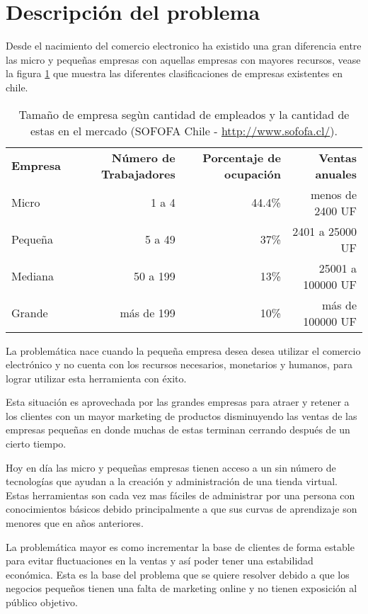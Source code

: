 \section{Descripción del problema}

Desde el nacimiento del comercio electronico ha existido una gran diferencia
entre las micro y pequeñas empresas con aquellas empresas con mayores recursos,
vease la figura \ref{tab:tam_empresa} que muestra las diferentes clasificaciones
de empresas existentes en chile.

\begin{table}[h]
\centering
\begin{tabular}{lrrr}
{\bf Empresa}  & {\bf Número de Trabajadores} & {\bf Porcentaje de ocupación} & {\bf Ventas anuales}\\
Micro    & 1 a 4                & 44.4\%  & menos de 2400 UF\\
Pequeña  & 5 a 49               & 37\%  & 2401 a 25000 UF\\
Mediana  & 50 a 199             & 13\%  & 25001 a 100000 UF\\
Grande   & más de 199           & 10\%  & más de 100000 UF\\
\end{tabular}
\caption[TamañoEmpresa]{Tamaño de empresa segùn cantidad de empleados y
la cantidad de estas en el mercado (SOFOFA Chile - \url{http://www.sofofa.cl/}).}
\label{tab:tam_empresa}
\end{table}


La problemática nace cuando la pequeña empresa desea desea utilizar el comercio
electrónico y no cuenta con los recursos necesarios, monetarios y humanos,
para lograr utilizar esta herramienta con éxito.

Esta situación es aprovechada por las grandes empresas para atraer y retener a los
clientes con un mayor marketing de productos disminuyendo las ventas de las
empresas pequeñas en donde muchas de estas terminan cerrando después de un cierto
tiempo.

Hoy en día las micro y pequeñas empresas tienen acceso a un sin número de
tecnologías que ayudan a la creación y administración de una tienda virtual.
Estas herramientas son cada vez mas fáciles de administrar por una persona
con conocimientos básicos debido principalmente a que sus curvas de aprendizaje
son menores que en años anteriores.

La problemática mayor es como incrementar la base de clientes de forma estable
para evitar fluctuaciones en la ventas y así poder tener una estabilidad económica.
Esta es la base del problema que se quiere resolver debido a que los negocios
pequeños tienen una falta de marketing online y no tienen exposición al público
objetivo.

